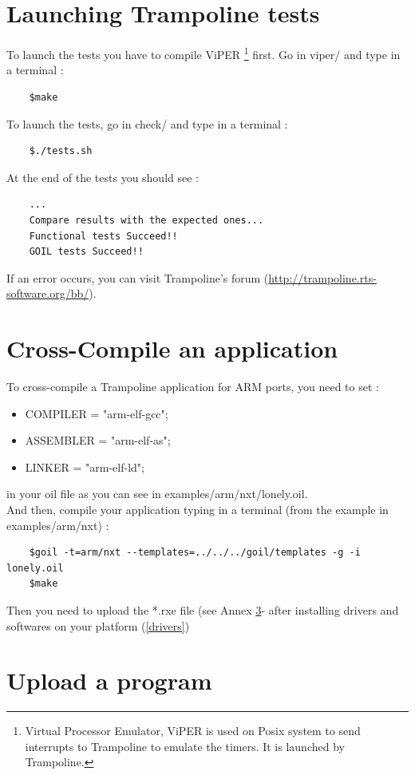 \documentclass[10pt]{article}
\begin{document}
\newpage
\appendix
\section{Launching Trampoline tests} \label{tests}
To launch the tests you have to compile ViPER \footnote{Virtual Processor Emulator, ViPER is used on Posix system to send interrupts to Trampoline to emulate the timers. It is launched by Trampoline.} first. Go in viper/ and type in a terminal :
	\begin{verbatim}
	$make
	\end{verbatim}
To launch the tests, go in check/ and type in a terminal :
	\begin{verbatim}
	$./tests.sh
	\end{verbatim}
At the end of the tests you should see :
	\begin{verbatim}
	...
	Compare results with the expected ones...
	Functional tests Succeed!!
	GOIL tests Succeed!!
	\end{verbatim}
If an error occurs, you can visit Trampoline's forum (\href{http://trampoline.rts-software.org/bb/}{http://trampoline.rts-software.org/bb/}).


\section{Cross-Compile an application} \label{compileanapplication}
To cross-compile a Trampoline application for ARM ports, you need to set  :
\begin{itemize}
\item COMPILER = "arm-elf-gcc";
\item ASSEMBLER = "arm-elf-as";
\item LINKER = "arm-elf-ld";
\end{itemize}
in your oil file as you can see in examples/arm/nxt/lonely.oil.\\
And then, compile your application typing in a terminal (from the example in examples/arm/nxt) :
	\begin{verbatim}
	$goil -t=arm/nxt --templates=../../../goil/templates -g -i lonely.oil
	$make
	\end{verbatim}
Then you need to upload the *.rxe file (see Annex \ref{uploadprogram}- after installing drivers and softwares on your platform (\ref{drivers})

\section{Upload a program} \label{uploadprogram}
\end{document}

